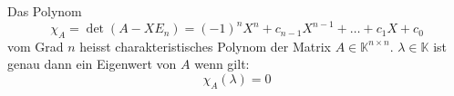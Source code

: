 Das Polynom
$$\chi_A = \det( A - X E_n) = (-1)^n X^n + c_{n-1} X^{n - 1} + \dots + c_1 X + c_0$$
vom Grad $n$ heisst charakteristisches Polynom der Matrix $A \in \mathbb{K}^{n \times n}$.
$\lambda \in \mathbb{K}$ ist genau dann ein Eigenwert von $A$ wenn gilt:
$$\chi_A(\lambda) = 0$$
